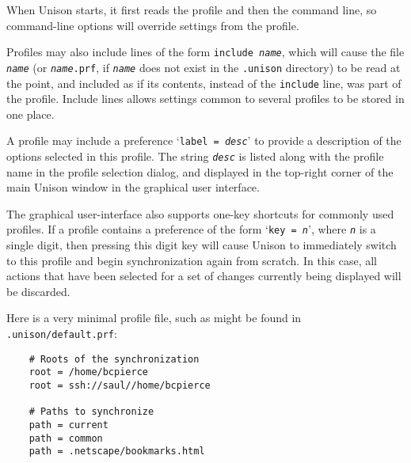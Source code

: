 \documentclass{article}
\newcommand{\ARG}[1]{\texttt{\textit{#1}}}
\begin{document}
When Unison starts, it first reads the profile and then the command
line, so command-line options will override settings from the
profile.  

Profiles may also include lines of the form \texttt{include
  \ARG{name}}, which will cause the file \ARG{name} (or
\texttt{\ARG{name}.prf}, if \ARG{name} does not exist in the
\verb+.unison+ directory) to be read at the point, and included as if
its contents, instead of the \texttt{include} line, was part of the
profile.  Include lines allows settings common to several profiles to
be stored in one place.

A profile may include a preference `\texttt{label = \ARG{desc}}' to
provide a description of the options selected in this profile.  The
string \ARG{desc} is listed along with the profile name in the profile
selection dialog, and displayed in the top-right corner of the main
Unison window in the graphical user interface.

The graphical user-interface also supports one-key shortcuts for commonly
used profiles.  If a profile contains a preference of the form 
%
`\texttt{key = \ARG{n}}', where \ARG{n} is a single digit, then
pressing this digit key will cause Unison to immediately switch to
this profile and begin synchronization again from scratch.  In this
case, all actions that have been selected for a set of changes
currently being displayed will be discarded.




Here is a very minimal profile file, such as might be found in {\tt
  .unison/default.prf}:
\begin{verbatim}
    # Roots of the synchronization
    root = /home/bcpierce
    root = ssh://saul//home/bcpierce

    # Paths to synchronize 
    path = current
    path = common
    path = .netscape/bookmarks.html
\end{verbatim}

\end{document}
